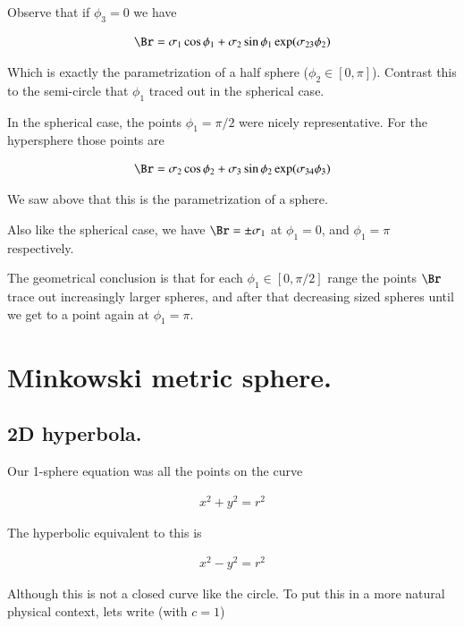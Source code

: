 \begin{itemize}
Observe that if $\phi_3 = 0$ we have

\begin{align*}
\Br
&= \sigma_1 \cos\phi_1 + \sigma_2 \sin\phi_1 \exp( \sigma_{23} \phi_2 ) \\
\end{align*}

Which is exactly the parametrization of a half sphere ($\phi_2 \in [0,\pi]$).  Contrast this to the semi-circle that $\phi_1$ traced out in the spherical case.  

In the spherical case, the points $\phi_1 = \pi/2$ were nicely representative.  For the hypersphere those points are

\begin{align*}
\Br &= \sigma_2 \cos\phi_2 + \sigma_3 \sin\phi_2 \exp(\sigma_{34}\phi_3) \\
\end{align*}

We saw above that this is the parametrization of a sphere.

Also like the spherical case, we have $\Br = \pm \sigma_1$ at $\phi_1 = 0$, and $\phi_1 = \pi$ respectively.

The geometrical conclusion is that for each $\phi_1 \in [0,\pi/2]$ range the points $\Br$ trace out increasingly
larger spheres, and after that decreasing sized spheres until we get to a point again at $\phi_1 = \pi$.

\end{itemize}

\section{Minkowski metric sphere. }

\subsection{2D hyperbola. }

Our 1-sphere equation was all the points on the curve

\begin{align*}
x^2 + y^2 = r^2
\end{align*}

The hyperbolic equivalent to this is

\begin{align*}
x^2 - y^2 = r^2
\end{align*}

Although this is not a closed curve like the circle.  To put this in a 
more natural physical context, lets write (with $c=1$)


